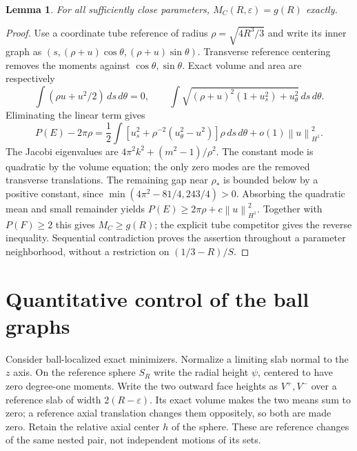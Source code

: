 \documentclass[11pt]{article}
\newcommand{\eps}{\varepsilon}
\newcommand{\norm}[1]{\left\|#1\right\|}
\newtheorem{lemma}[theorem]{Lemma}
\theoremstyle{remark}\newtheorem{remark}[theorem]{Remark}
\numberwithin{equation}{section}
\begin{document}
\begin{lemma}\label{lem:tube}
For all sufficiently close parameters, $M_C(R,\eps)=g(R)$ exactly.
\end{lemma}
\begin{proof}
Use a coordinate tube reference of radius $\rho=\sqrt{4R^3/3}$ and
write its inner graph as
$(s,(\rho+u)\cos\theta,(\rho+u)\sin\theta)$.
Transverse reference centering removes the moments against
$\cos\theta,\sin\theta$. Exact volume and area are respectively
\[
 \int(\rho u+u^2/2)\,ds\,d\theta=0,\qquad
 \int\sqrt{(\rho+u)^2(1+u_s^2)+u_\theta^2}\,ds\,d\theta.
\]
Eliminating the linear term gives
\[
 P(E)-2\pi\rho=\frac12\int
 [u_s^2+\rho^{-2}(u_\theta^2-u^2)]\rho\,ds\,d\theta
 +o(1)\norm u_{H^1}^2.
\]
The Jacobi eigenvalues are $4\pi^2 k^2+(m^2-1)/\rho^2$.
The constant mode is quadratic by the volume equation; the only zero
modes are the removed transverse translations. The remaining gap near
$\rho_*$ is bounded below by a positive constant, since
$\min(4\pi^2-81/4,243/4)>0$. Absorbing the quadratic mean and
small remainder yields $P(E)\geq2\pi\rho+c\norm u_{H^1}^2$.
Together with $P(F)\geq2$ this gives $M_C\geq g(R)$; the explicit
tube competitor gives the reverse inequality. Sequential contradiction
proves the assertion throughout a parameter neighborhood, without a
restriction on $(1/3-R)/S$.
\end{proof}

\section{Quantitative control of the ball graphs}\label{sec:quantitative}
Consider ball-localized exact minimizers. Normalize a limiting slab normal
to the $z$ axis. On the reference sphere $S_R$ write the radial height
$\psi$, centered to have zero degree-one moments. Write the two outward
face heights as $V^+,V^-$ over a reference slab of width $2(R-\eps)$.
Its exact volume makes the two means sum to zero; a reference axial
translation changes them oppositely, so both are made zero. Retain the
relative axial center $h$ of the sphere. These are reference changes of
the same nested pair, not independent motions of its sets.
\end{document}
